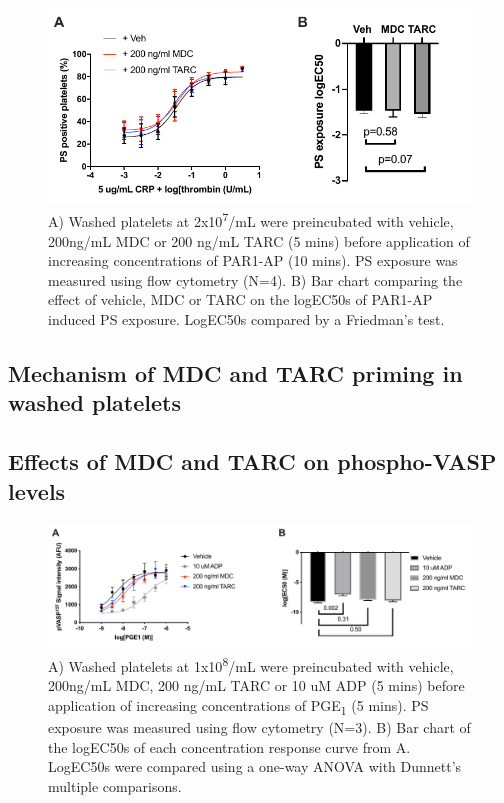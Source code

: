 \documentclass[11pt,twoside]{bristolthesis}
\begin{document}
\begin{figure}
\includegraphics{figure/Chemokines/Layouts/MDC_TARC_PS_exposure_layout} \caption[The effect of the chemokines MDC and TARC on PAR1-AP induced PS exposure]{A) Washed platelets at 2x10\textsuperscript{7}/mL were preincubated with vehicle, 200ng/mL MDC or 200 ng/mL TARC (5 mins) before application of increasing concentrations of PAR1-AP (10 mins). PS exposure was measured using flow cytometry (N=4). B) Bar chart comparing the effect of vehicle, MDC or TARC on the logEC50s of PAR1-AP induced PS exposure. LogEC50s compared by a Friedman's test.}\label{fig:MDC-TARC-PS-exposure}
\end{figure}
\hypertarget{mechanism-of-mdc-and-tarc-priming-in-washed-platelets}{%
\subsection{Mechanism of MDC and TARC priming in washed platelets}\label{mechanism-of-mdc-and-tarc-priming-in-washed-platelets}}

\hypertarget{effects-of-mdc-and-tarc-on-phospho-vasp-levels}{%
\subsection{Effects of MDC and TARC on phospho-VASP levels}\label{effects-of-mdc-and-tarc-on-phospho-vasp-levels}}



\begin{figure}
\includegraphics{figure/Chemokines/Layouts/MDC_TARC_VASP_FACS_logec50} \caption[The effect of the chemokines MDC and TARC on phospho-VASP levels]{A) Washed platelets at 1x10\textsuperscript{8}/mL were preincubated with vehicle, 200ng/mL MDC, 200 ng/mL TARC or 10 uM ADP (5 mins) before application of increasing concentrations of PGE\textsubscript{1} (5 mins). PS exposure was measured using flow cytometry (N=3). B) Bar chart of the logEC50s of each concentration response curve from A. LogEC50s were compared using a one-way ANOVA with Dunnett's multiple comparisons.}\label{fig:MDC-TARC-VASP-FACS}
\end{figure}
\end{document}
